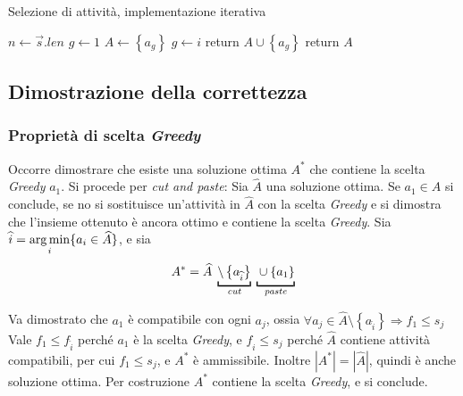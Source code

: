 \begin{algorithm}[H]
\caption{Selezione di attività, implementazione iterativa}\label{alg:asiter}
\begin{algorithmic}[1]
        \State $n \gets \vec{s}.len$
        \State $g \gets 1$
        \State $A \gets \left\{ a_g \right\}$
                \State $g \gets i$
                \State return $A \cup \left\{ a_g \right\}$
            \EndIf
        \EndFor
        \State return $A$
    \EndProcedure
\end{algorithmic}
\end{algorithm}

\subsection{Dimostrazione della correttezza}

\subsubsection{Proprietà di scelta \emph{Greedy}}

Occorre dimostrare che esiste una soluzione ottima $A^*$ che contiene la scelta \emph{Greedy} ${a_1}$. Si procede per \emph{cut and paste}: Sia $\widehat{A}$ una soluzione ottima. Se ${a_1} \in \widehat{A}$ si conclude, se no si sostituisce un'attività in $\widehat{A}$ con la scelta \emph{Greedy} e si dimostra che l'insieme ottenuto è ancora ottimo e contiene la scelta \emph{Greedy}.
Sia $\widehat{i} =  \operatorname*{arg\,min}\limits_i \{ a_i \in \widehat{A} \} $, e sia
\[
A^* = \widehat{A} 
\;
\underbracket[1pt]{
\setminus \left\{ a_{\widehat{i}} \right\} 
}_{\text{\emph{cut}}}
\;
\underbracket[1pt]{
\vphantom{ \setminus \left\{ a_{\widehat{i}} \right\} }
\cup \left\{ a_1 \right\}
}_{\text{\emph{paste}}}
\]

Va dimostrato che $a_1$ è compatibile con ogni $a_j$, ossia 
$\forall a_j \in \widehat{A} \setminus \left\{ a_{\widehat{i}} \right\} \Rightarrow f_1 \leq s_j$
\\
Vale $f_1 \leq f_{\widehat{i}}$ perché $a_1$ è la scelta \emph{Greedy}, e $f_{\widehat{i}} \leq s_j$ perché $\widehat{A}$ contiene attività compatibili, per cui $f_1 \leq s_j$, e $A^*$ è ammissibile. Inoltre $|A^*| = |\widehat{A}|$, quindi è anche soluzione ottima. Per costruzione $A^*$ contiene la scelta \emph{Greedy}, e si conclude.

